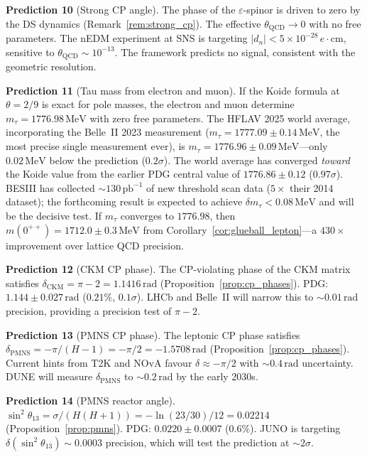 \documentclass[11pt,a4paper]{article}
\theoremstyle{definition}
\theoremstyle{remark}
\begin{document}
\textbf{Prediction 10} (Strong CP angle). The phase of the $\varepsilon$-spinor is driven to zero by the DS dynamics (Remark~\ref{rem:strong_cp}). The effective $\theta_\mathrm{QCD}\to 0$ with no free parameters. The nEDM experiment at SNS is targeting $|d_n|<5\times 10^{-28}\,e\cdot\mathrm{cm}$, sensitive to $\theta_\mathrm{QCD}\sim 10^{-13}$. The framework predicts no signal, consistent with the geometric resolution.

\textbf{Prediction 11} (Tau mass from electron and muon). If the Koide formula at $\theta=2/9$ is exact for pole masses, the electron and muon determine $m_\tau=1776.98\,\mathrm{MeV}$ with zero free parameters. The HFLAV 2025 world average, incorporating the Belle~II 2023 measurement ($m_\tau=1777.09\pm 0.14\,\mathrm{MeV}$, the most precise single measurement ever), is $m_\tau=1776.96\pm 0.09\,\mathrm{MeV}$---only $0.02\,\mathrm{MeV}$ below the prediction ($0.2\sigma$). The world average has converged \emph{toward} the Koide value from the earlier PDG central value of $1776.86\pm 0.12$ ($0.97\sigma$). BESIII has collected $\sim\!130\,\mathrm{pb}^{-1}$ of new threshold scan data ($5\times$ their 2014 dataset); the forthcoming result is expected to achieve $\delta m_\tau<0.08\,\mathrm{MeV}$ and will be the decisive test. If $m_\tau$ converges to $1776.98$, then $m(0^{++})=1712.0\pm 0.3\,\mathrm{MeV}$ from Corollary~\ref{cor:glueball_lepton}---a $430\times$ improvement over lattice QCD precision.

\textbf{Prediction 12} (CKM CP phase). The CP-violating phase of the CKM matrix satisfies $\delta_{\mathrm{CKM}}=\pi-2=1.1416\,\mathrm{rad}$ (Proposition~\ref{prop:cp_phases}). PDG: $1.144\pm 0.027\,\mathrm{rad}$ ($0.21\%$, $0.1\sigma$). LHCb and Belle~II will narrow this to $\sim\!0.01\,\mathrm{rad}$ precision, providing a precision test of $\pi-2$.

\textbf{Prediction 13} (PMNS CP phase). The leptonic CP phase satisfies $\delta_{\mathrm{PMNS}}=-\pi/(H-1)=-\pi/2=-1.5708\,\mathrm{rad}$ (Proposition~\ref{prop:cp_phases}). Current hints from T2K and NOvA favour $\delta\approx -\pi/2$ with $\sim\!0.4\,\mathrm{rad}$ uncertainty. DUNE will measure $\delta_{\mathrm{PMNS}}$ to $\sim\!0.2\,\mathrm{rad}$ by the early 2030s.

\textbf{Prediction 14} (PMNS reactor angle). $\sin^2\theta_{13}=\sigma/(H(H+1))=-\ln(23/30)/12=0.02214$ (Proposition~\ref{prop:pmns}). PDG: $0.0220\pm 0.0007$ ($0.6\%$). JUNO is targeting $\delta(\sin^2\theta_{13})\sim 0.0003$ precision, which will test the prediction at $\sim\!2\sigma$.
\end{document}
